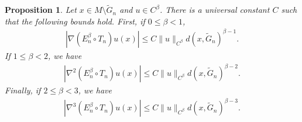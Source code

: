 \documentclass[11pt,reqno]{amsart}
\numberwithin{equation}{section}
\theoremstyle{plain}
\newtheorem*{prop*}{Proposition}
\begin{document}
\begin{prop*}
  Let $x \in M\setminus \tilde G_n$ and $u\in C^\beta$. There is a universal constant $C$ such that the following bounds hold. First, if $0\leq\beta<1$, 
  \begin{align*}	
    |\nabla (E_n^\beta\circ T_n)u(x)|\leq C\|u\|_{C^\beta}d(x,\tilde G_n)^{\beta-1}.
  \end{align*}	
  If $1\leq\beta<2$, we have
  \begin{align*}	
    |\nabla^2(E_n^\beta\circ T_n)u(x)|\leq C\|u\|_{C^\beta}d(x,\tilde G_n)^{\beta-2}.
  \end{align*}	
  Finally, if $2\leq\beta<3$, we have
  \begin{align*}	
    |\nabla^3(E_n^\beta\circ T_n)u(x)|\leq C\|u\|_{C^\beta}d(x,\tilde G_n)^{\beta-3}.
  \end{align*}	
 
\end{prop*}
\end{document}
